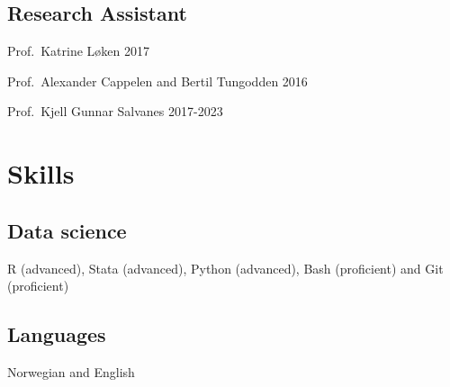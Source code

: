 \documentclass[11pt,]{article}
\begin{document}
\hypertarget{research-assistant}{%
\subsection{Research Assistant}\label{research-assistant}}

Prof.~Katrine Løken \hfill 2017\vspace{-0.2cm}

Prof.~Alexander Cappelen and Bertil Tungodden \hfill 2016\vspace{-0.2cm}

Prof.~Kjell Gunnar Salvanes \hfill 2017-2023\vspace{-0.2cm}

\vspace{0.5cm}

\hypertarget{skills}{%
\section{Skills}\label{skills}}

\hypertarget{data-science}{%
\subsection{Data science}\label{data-science}}

R (advanced), Stata (advanced), Python (advanced), Bash (proficient) and
Git (proficient)\vspace{-0.2cm}

\vspace{0.5cm}

\vspace{-0.3cm}

\hypertarget{languages}{%
\subsection{Languages}\label{languages}}

Norwegian and English\vspace{-0.2cm}

\vspace{0.5cm}
\end{document}
